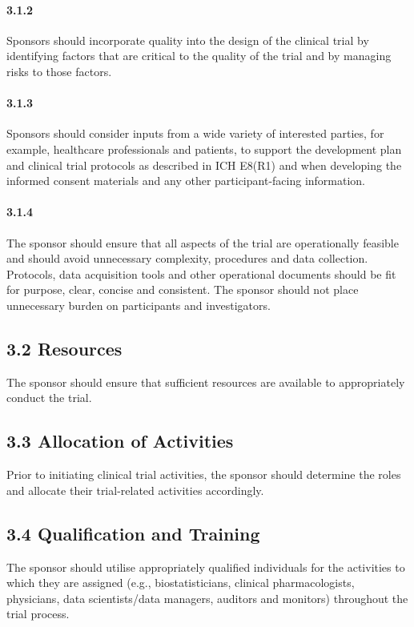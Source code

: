 \documentclass[11pt]{article}
\begin{document}
\paragraph{3.1.2} Sponsors should incorporate quality into the design of the clinical trial by identifying factors that are critical to the quality of the trial and by managing risks to those factors.

\paragraph{3.1.3} Sponsors should consider inputs from a wide variety of interested parties, for example, healthcare professionals and patients, to support the development plan and clinical trial protocols as described in ICH E8(R1) and when developing the informed consent materials and any other participant-facing information.

\paragraph{3.1.4} The sponsor should ensure that all aspects of the trial are operationally feasible and should avoid unnecessary complexity, procedures and data collection. Protocols, data acquisition tools and other operational documents should be fit for purpose, clear, concise and consistent. The sponsor should not place unnecessary burden on participants and investigators.

\subsection{3.2 Resources}

The sponsor should ensure that sufficient resources are available to appropriately conduct the trial.


\subsection{3.3 Allocation of Activities}

Prior to initiating clinical trial activities, the sponsor should determine the roles and allocate their trial-related activities accordingly.


\subsection{3.4 Qualification and Training}

The sponsor should utilise appropriately qualified individuals for the activities to which they are assigned (e.g., biostatisticians, clinical pharmacologists, physicians, data scientists/data managers, auditors and monitors) throughout the trial process.
\end{document}

